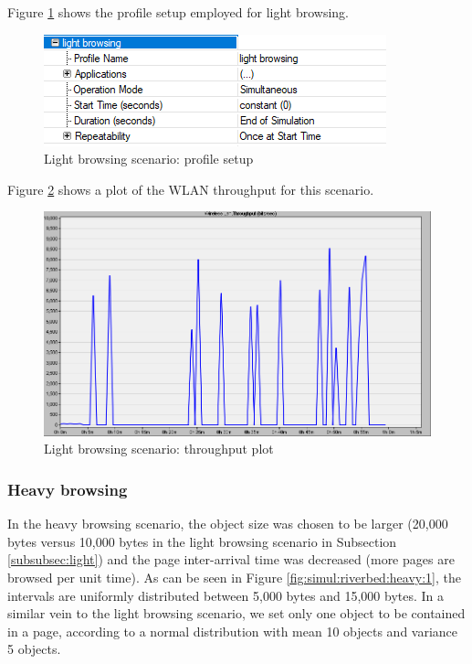 Figure \ref{fig:simul:riverbed:light:3} shows the profile setup employed for light browsing.

\begin{figure}[H]
	\centering
	\includegraphics[scale=0.6]{Figures/amantianrenamed/ScenariooneLightBrowsingProfilesetup.png}
	\caption{Light browsing scenario: profile setup}
	\label{fig:simul:riverbed:light:3}
\end{figure}

Figure \ref{fig:simul:riverbed:light:4} shows a plot of the \gls{WLAN} throughput for this scenario.

\begin{figure}[H]
	\centering
	\includegraphics[scale=0.42]{Figures/amantianrenamed/ScenariooneThroughputofLightbrowsing.png}
	\caption{Light browsing scenario: throughput plot}
	\label{fig:simul:riverbed:light:4}
\end{figure}

\subsubsection{Heavy browsing} \label{subsubsec:heavy}
In the heavy browsing scenario, the object size was chosen to be larger (20,000 bytes versus 10,000 bytes in the light browsing scenario in Subsection \ref{subsubsec:light}) and the page inter-arrival time was decreased (more pages are browsed per unit time). As can be seen in Figure \ref{fig:simul:riverbed:heavy:1}, the intervals are uniformly distributed between 5,000 bytes and 15,000 bytes. In a similar vein to the light browsing scenario, we set only one object to be contained in a page, according to a normal distribution with mean 10 objects and variance 5 objects.

